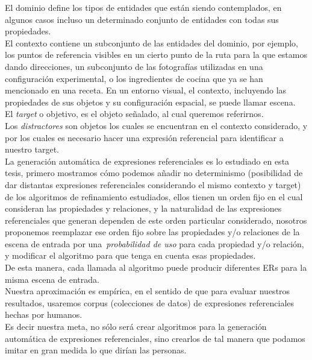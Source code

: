 El dominio define los tipos de entidades que est\'an siendo contemplados, en algunos
casos incluso un determinado conjunto de entidades con todas sus propiedades.\\

El contexto contiene un subconjunto de las entidades del dominio, por ejemplo, los puntos de referencia visibles en un cierto punto de la ruta para la que estamos dando direcciones, un
subconjunto de las fotograf\'ias utilizadas en una configuraci\'on experimental, o los ingredientes de cocina que ya se han mencionado en una receta. En un entorno visual, el contexto, incluyendo las
propiedades de sus objetos y su configuraci\'on espacial, se puede llamar escena. \\

El \emph{target} o objetivo, es el objeto se\~nalado, al cual queremos referirnos.\\

Los \emph{distractores} son objetos los cuales se encuentran en el contexto considerado, y por los cuales es necesario hacer una expresi\'on referencial para identificar a nuestro target. \\

La generaci\'on autom\'atica de expresiones referenciales es lo estudiado en esta tesis, 
primero mostramos c\'omo podemos a\~nadir no determinismo (posibilidad de dar distantas expresiones referenciales considerando el mismo contexto y target) de los algoritmos de refinamiento estudiados, ellos tienen un orden fijo en el cual consideran las propiedades y relaciones, y la naturalidad de las expresiones referenciales que generan dependen de este orden particular considerado, nosotros proponemos reemplazar ese orden fijo
sobre las propiedades y/o relaciones de la escena de entrada por una~\emph{probabilidad de uso} para cada propiedad y/o relaci\'on, y modificar el algoritmo para que tenga en cuenta esas propiedades.\\

De esta manera, cada llamada al algoritmo puede producir diferentes ERs para la misma escena de entrada. \\

Nuestra aproximaci\'on es emp\'irica, en el sentido de que para evaluar nuestros resultados, usaremos corpus (colecciones de datos) de expresiones referenciales hechas por humanos. \\

Es decir nuestra meta, no s\'olo ser\'a crear algoritmos para la generaci\'on autom\'atica de expresiones referenciales, sino crearlos de tal manera que podamos imitar en gran medida lo que dir\'ian las personas.\\

